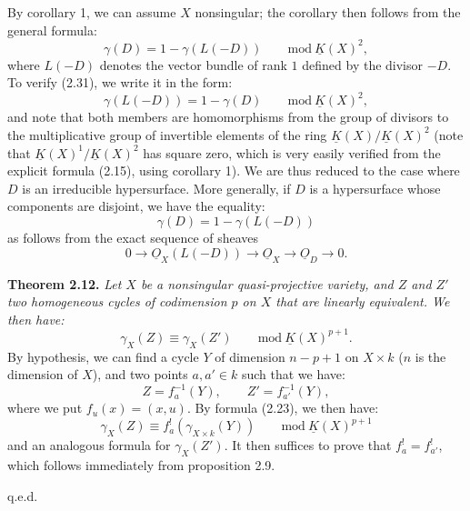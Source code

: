 By corollary 1, we can assume $X$ nonsingular; the corollary then follows from the general formula:
\begin{equation}\tag{2.31}
 \gamma(D)=1-\gamma(L(-D))\qquad\mathrm{mod}\ \underline K(X)^2,
\end{equation}
where $L(-D)$ denotes the vector bundle of rank $1$ defined by the divisor $-D$. To verify (2.31), we write it in the form:
\begin{equation}\tag{2.31 bis}
 \gamma(L(-D))=1-\gamma(D)\qquad\mathrm{mod}\ \underline K(X)^2,
\end{equation}
and note that both members are homomorphisms from the group of divisors to the multiplicative group of invertible elements of the ring $\underline K(X)/\underline K(X)^2$ (note that $\underline K(X)^1/\underline K(X)^2$ has square zero, which is very easily verified from the explicit formula (2.15), using corollary 1). We are thus reduced to the case where $D$ is an irreducible hypersurface. More generally, if $D$ is a hypersurface whose components are disjoint, we have the equality:
\begin{equation}\tag{2.32}
 \gamma(D)=1-\gamma(L(-D))
\end{equation}
as follows from the exact sequence of sheaves
\[
0\longrightarrow\underline{O}_X(L(-D))\longrightarrow\underline{O}_X\longrightarrow\underline{O}_D\longrightarrow0.
\]

\textbf{Theorem 2.12.} \emph{Let $X$ be a nonsingular quasi-projective variety, and $Z$ and $Z'$ two homogeneous cycles of codimension $p$ on $X$ that are linearly equivalent. We then have:}
\begin{equation}\tag{2.33}
 \gamma_X(Z)\equiv\gamma_X(Z')\qquad\mathrm{mod}\ \underline K(X)^{p+1}.
\end{equation}
By hypothesis, we can find a cycle $Y$ of dimension $n-p+1$ on
%
$X\times k$ ($n$ is the
dimension of $X$), and two points $a,a'\in k$ such that we have:
\[
 Z=f_a^{-1}(Y),\qquad Z'=f_{a'}^{-1}(Y),
\]
where we put $f_u(x)=(x,u)$. By formula (2.23), we then have:
\[
 \gamma_X(Z)\equiv f_a^!(\gamma_{X\times k}(Y))\qquad\mathrm{mod}\ \underline K(X)^{p+1}
\]
and an analogous formula for $\gamma_X(Z')$. It then suffices to prove that $f_a^!=f_{a'}^!$, which follows immediately from proposition 2.9.
\begin{flushright}q.e.d.\end{flushright}

